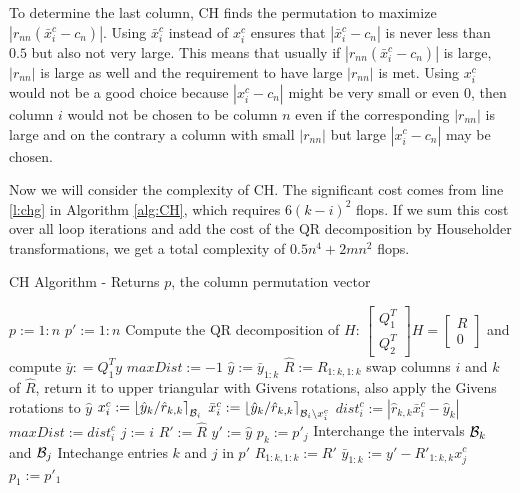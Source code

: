 \documentclass[12pt,Bold,letterpaper]{mcgilletdclass}
\newcommand{\bsmx}{\left[\begin{smallmatrix}}
\newcommand{\esmx}{\end{smallmatrix}\right]}
\begin{document}
To determine the last column, CH finds the permutation to 
maximize $\left |r_{nn}(\bar{x}_i^c-c_n) \right |$. Using $\bar{x}_i^c$ instead of $x_i^c$
ensures that $\left | \bar{x}_i^c-c_n \right |$ is never less than $0.5$ but
also not very large. This means that usually if $\left | r_{nn}(\bar{x}_i^c-c_n)
\right |$ is large, $\left | r_{nn} \right |$ is large as well and the
requirement to have large $|r_{nn}|$ %
is met.
Using $x_i^c$ would not be a good choice because $\left | x_i^c - c_n \right |$ might be 
very small or even $0$, then column $i$ would not be chosen to be column $n$
even if the corresponding $|r_{nn}|$ is large and on the contrary a column with small $|r_{nn}|$
but large $|x_i^c-c_n|$ may be chosen.

Now we will consider the complexity of CH. The 
significant cost comes from line \ref{l:chg} in Algorithm \ref{alg:CH},
which requires $6(k-i)^2$ flops.
If we sum this cost over all loop iterations and add the cost of the QR decomposition by Householder transformations, 
we  get a total complexity of $0.5n^4+2mn^2$ flops.

\begin{algorithm}
\caption{CH Algorithm - Returns $p$, the column permutation vector}
\label{alg:CH}
\begin{algorithmic}[1]
\STATE $p := 1:n$
\STATE $p' := 1:n$
\STATE Compute the QR decomposition of $H$: $\bsmx Q_1^T \\ Q_2^T \esmx H= \bsmx R\\ 0 \esmx$
             and compute  $\bar{y} : = Q_1^Ty$
  	\STATE $maxDist := -1$
    	\STATE $\hat{y} := \bar{y}_{1:k}$
    	\STATE $\hat{R} := R_{1:k,1:k}$
        \STATE  \label{l:chg} swap columns $i$ and $k$ of $\hat{R}$, return it  to upper
triangular with Givens rotations, also apply the Givens rotations to $\hat{y}$ %
        \STATE $x_i^c := \left \lfloor\hat{y}_k/\hat{r}_{k,k}\right
\rceil_{{\cal B}_i}$
        \STATE $\bar{x}_i^c := \left \lfloor\hat{y}_k/\hat{r}_{k,k}\right
\rceil_{{\cal B}_i\backslash x_i^c}$
        \STATE $dist_i^c := \left | \hat{r}_{k,k}\bar{x}_i^c - \hat{y}_k
\right | $
        	\STATE $maxDist := dist_i^c$
        	\STATE $j := i$
        	\STATE $R' := \hat{R}$
        	\STATE $y' := \hat{y}$
        \ENDIF
    \ENDFOR
    \STATE $p_k := p'_j$
    \STATE Interchange the intervals ${{\cal B}_k}$ and ${{\cal B}_{j}}$
    \STATE Intechange entries $k$ and $j$ in $p'$
    \STATE $R_{1:k,1:k} := R'$
    \STATE $\bar{y}_{1:k} := y' - R'_{1:k,k}x_j^c$
  \ENDFOR
  \STATE $p_1 := p'_1$
\end{algorithmic}
\end{algorithm}
\end{document}
